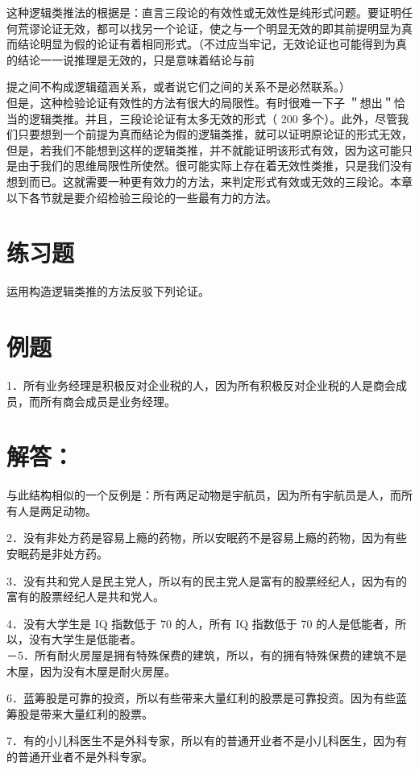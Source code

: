 这种逻辑类推法的根据是：直言三段论的有效性或无效性是纯形式问题。要证明任何荒谬论证无效，都可以找另一个论证，使之与一个明显无效的即其前提明显为真而结论明显为假的论证有着相同形式。（不过应当牢记，无效论证也可能得到为真的结论一一说推理是无效的，只是意味着结论与前

提之间不构成逻辑蕴涵关系，或者说它们之间的关系不是必然联系。）\\
但是，这种检验论证有效性的方法有很大的局限性。有时很难一下子 ＂想出＂恰当的逻辑类推。并且，三段论论证有太多无效的形式（ 200 多个）。此外，尽管我们只要想到一个前提为真而结论为假的逻辑类推，就可以证明原论证的形式无效，但是，若我们不能想到这样的逻辑类推，并不就能证明该形式有效，因为这可能只是由于我们的思维局限性所使然。很可能实际上存在着无效性类推，只是我们没有想到而已。这就需要一种更有效力的方法，来判定形式有效或无效的三段论。本章以下各节就是要介绍检验三段论的一些最有力的方法。

\section*{练习题}
运用构造逻辑类推的方法反驳下列论证。

\section*{例题}
1．所有业务经理是积极反对企业税的人，因为所有积极反对企业税的人是商会成员，而所有商会成员是业务经理。

\section*{解答：}
与此结构相似的一个反例是：所有两足动物是宇航员，因为所有宇航员是人，而所有人是两足动物。

2．没有非处方药是容易上瘾的药物，所以安眠药不是容易上瘾的药物，因为有些安眠药是非处方药。

3．没有共和党人是民主党人，所以有的民主党人是富有的股票经纪人，因为有的富有的股票经纪人是共和党人。

4．没有大学生是 IQ 指数低于 70 的人，所有 IQ 指数低于 70 的人是低能者，所以，没有大学生是低能者。\\
－5．所有耐火房屋是拥有特殊保费的建筑，所以，有的拥有特殊保费的建筑不是木屋，因为没有木屋是耐火房屋。

6．蓝筹股是可靠的投资，所以有些带来大量红利的股票是可靠投资。因为有些蓝筹股是带来大量红利的股票。

7．有的小儿科医生不是外科专家，所以有的普通开业者不是小儿科医生，因为有的普通开业者不是外科专家。

